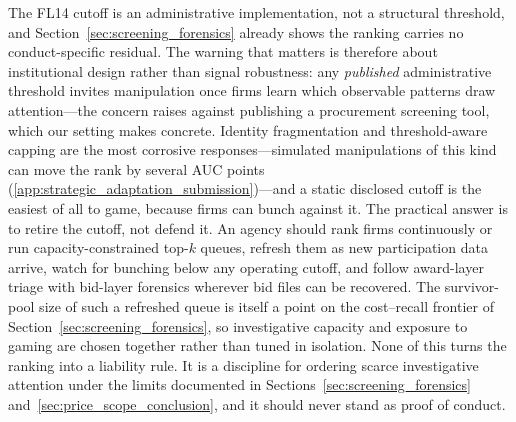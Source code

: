 The FL14 cutoff is an administrative implementation, not a structural
threshold, and Section~\ref{sec:screening_forensics} already shows the
ranking carries no conduct-specific residual. The warning that matters
is therefore about institutional design rather than signal robustness:
any \emph{published} administrative threshold invites manipulation once
firms learn which observable patterns draw attention---the concern
\citet{sanchezgraells2019screening} raises against publishing a procurement
screening tool, which our setting makes concrete. Identity
fragmentation and threshold-aware capping are the most corrosive
responses---simulated manipulations of this kind can move the rank by
several AUC points (\ref{app:strategic_adaptation_submission})---and a
static disclosed cutoff is the easiest of all to game, because firms
can bunch against it. The practical answer is to retire the cutoff, not
defend it. An agency should rank firms continuously or run
capacity-constrained top-$k$ queues, refresh them as new participation
data arrive, watch for bunching below any operating cutoff, and follow
award-layer triage with bid-layer forensics wherever bid files can be
recovered. The survivor-pool size of such a refreshed queue is itself a
point on the cost--recall frontier of
Section~\ref{sec:screening_forensics}, so investigative capacity and
exposure to gaming are chosen together rather than tuned in isolation.
None of this turns the ranking into a liability rule. It is a discipline
for ordering scarce investigative attention under the limits documented
in Sections~\ref{sec:screening_forensics}
and~\ref{sec:price_scope_conclusion}, and it should never stand as
proof of conduct.
